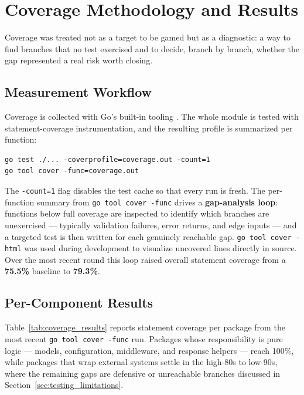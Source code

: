 \section{Coverage Methodology and Results}
\label{sec:coverage_methodology}

Coverage was treated not as a target to be gamed but as a diagnostic: a way to find branches that no test exercised and to decide, branch by branch, whether the gap represented a real risk worth closing.

\subsection{Measurement Workflow}

Coverage is collected with Go's built-in tooling \cite{go_testing}. The whole module is tested with statement-coverage instrumentation, and the resulting profile is summarized per function:

\begin{verbatim}
go test ./... -coverprofile=coverage.out -count=1
go tool cover -func=coverage.out
\end{verbatim}

The \texttt{-count=1} flag disables the test cache so that every run is fresh. The per-function summary from \texttt{go tool cover -func} drives a \textbf{gap-analysis loop}: functions below full coverage are inspected to identify which branches are unexercised --- typically validation failures, error returns, and edge inputs --- and a targeted test is then written for each genuinely reachable gap. \texttt{go tool cover -html} was used during development to visualize uncovered lines directly in source. Over the most recent round this loop raised overall statement coverage from a \textbf{75.5\%} baseline to \textbf{79.3\%}.

\subsection{Per-Component Results}

Table~\ref{tab:coverage_results} reports statement coverage per package from the most recent \texttt{go tool cover -func} run. Packages whose responsibility is pure logic --- models, configuration, middleware, and response helpers --- reach 100\%, while packages that wrap external systems settle in the high-80s to low-90s, where the remaining gaps are defensive or unreachable branches discussed in Section~\ref{sec:testing_limitations}.

